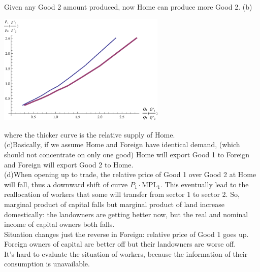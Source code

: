 \documentclass{article}
\begin{document}
\begin{description}
            Given any Good 2 amount produced, now Home can produce more Good 2.\newpage
           (b)\begin{center}
                    \includegraphics[angle=0, width=0.6\textwidth]{ECON3610A116}
            \end{center}
            where the thicker curve is the relative supply of Home.\\
           (c)Basically, if we assume Home and Foreign have identical demand, (which should not concentrate on only one good) Home will export Good 1 to Foreign and Foreign will export Good 2 to Home.\\
           (d)When opening up to trade, the relative price of Good 1 over Good 2 at Home will fall, thus a downward shift of curve $P_1\cdot \text{MPL}_1$. This eventually lead to the reallocation of workers that some will transfer from sector 1 to sector 2. So, marginal product of capital falls but marginal product of land increase domestically: the landowners are getting better now, but the real and nominal income of capital owners both falls. \\
            Situation changes just the reverse in Foreign: relative price of Good 1 goes up. Foreign owners of capital are better off but their landowners are worse off.\\
           It's hard to evaluate the situation of workers, because the information of their consumption is unavailable. \\


\end{description}
\end{document}
